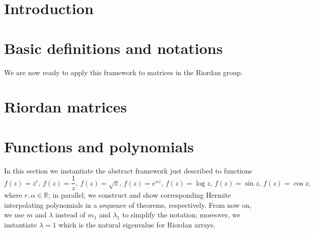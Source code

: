 
\section{Introduction}

\label{sec:introduction}


\section{Basic definitions and notations}



We are now ready to apply this framework to matrices in the Riordan group.

\section{Riordan matrices}



\iffalse %



\subsection{A component matrices characterization of Hermite interpolating polynomials}


\fi

\section{Functions and polynomials}

In this section we instantiate the abstract framework just described to functions
\begin{displaymath}
f(z)=z^{r},\,{f(z)=\frac{1}{z}},\,{f(z)=\sqrt{z}},\,{f(z)=e^{\alpha z}},\,
{f(z)=\log{z}},\,{f(z)=\sin{z}},\,{f(z)=\cos{z}}; 
\end{displaymath}
where $r,\alpha\in\mathbb{R}$; in parallel, we construct and show corresponding
Hermite interpolating polynomials in a sequence of theorems, respectively.
From now on, we use $m$ and $\lambda$ instead of $m_{1}$ and $\lambda_{1}$ to
simplify the notation; moreover, we instantiate $\lambda=1$ which is the
natural eigenvalue for Riordan arrays.

